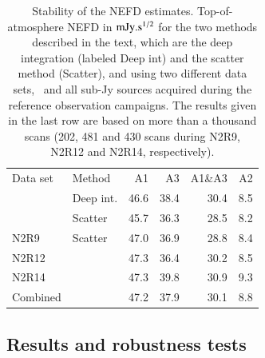 \begin{table}[!htbp]
  \centering
  \caption[]{Stability of the NEFD estimates. Top-of-atmosphere NEFD
    in $\rm{mJy}.s^{1/2}$ for the two methods described in the text, which
  are the deep integration (labeled Deep int) and the scatter method
  (Scatter), and using two different data sets, \hls\
  and all sub-Jy sources acquired during the reference observation
  campaigns. The results given in the last row are based on more than a thousand
  scans (202, 481 and 430 scans during N2R9, N2R12 and N2R14, respectively).}
  \label{tab:nefd_summary}
  \begin{tabular}{llrrrr}
    \hline\hline
    \noalign{\smallskip}
    Data set   & Method   & A1      &   A3    &   A1\&A3 &    A2 \\
    \noalign{\smallskip}
    \hline
    \noalign{\smallskip}
    \hls &     Deep int.  &  46.6  &    38.4  &    30.4  &   8.5  \\
         &     Scatter    &  45.7  &    36.3  &    28.5  &   8.2  \\
    \hline
    \noalign{\smallskip}
    N2R9     & Scatter    & 47.0 &  36.9  & 28.8  & 8.4 \\
    N2R12    &            & 47.3 &  36.4  & 30.2  & 8.5 \\
    N2R14    &            & 47.3 &  39.8  & 30.9  & 9.3 \\
    Combined &            & 47.2 &  37.9  & 30.1  & 8.8 \\
    \hline
  \end{tabular}
\end{table}

\subsection{Results and robustness tests}
\label{se:nefd_results}

